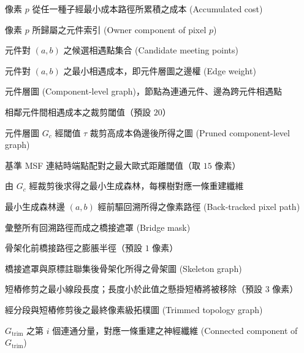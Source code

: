 \begin{denotation}[3cm]
\item[$D(p)$]{
  像素 $p$ 從任一種子經最小成本路徑所累積之成本 (Accumulated cost)
}

\item[$O(p)$]{
  像素 $p$ 所歸屬之元件索引 (Owner component of pixel $p$)
}

\item[$\mathcal{M}_{ab}$]{
  元件對 $(a, b)$ 之候選相遇點集合 (Candidate meeting points)
}

\item[$w_{ab}$]{
  元件對 $(a, b)$ 之最小相遇成本，即元件層圖之邊權 (Edge weight)
}

\item[$G_{c}$]{
  元件層圖 (Component-level graph)，節點為連通元件、邊為跨元件相遇點
}

\item[$\tau$]{
  相鄰元件間相遇成本之裁剪閾值（預設 $20$）
}

\item[$G_{c}^{\text{pruned}}$]{
  元件層圖 $G_{c}$ 經閾值 $\tau$ 裁剪高成本偽邊後所得之圖 (Pruned component-level graph)
}

\item[$d_{\max}$]{
  基準 MSF 連結時端點配對之最大歐式距離閾值（取 $15$ 像素）
}

\item[$G_{\text{msf}}$]{
  由 $G_{c}$ 經裁剪後求得之最小生成森林，每棵樹對應一條重建纖維
}

\item[$\Pi_{(a,b)}$]{
  最小生成森林邊 $(a, b)$ 經前驅回溯所得之像素路徑 (Back-tracked pixel path)
}

\item[$\mathcal{B}$]{
  彙整所有回溯路徑而成之橋接遮罩 (Bridge mask)
}

\item[$r_{d}$]{
  骨架化前橋接路徑之膨脹半徑（預設 $1$ 像素）
}

\item[$G_{\text{skel}}$]{
  橋接遮罩與原標註聯集後骨架化所得之骨架圖 (Skeleton graph)
}

\item[$\ell_{\min}$]{
  短樁修剪之最小線段長度；長度小於此值之懸掛短樁將被移除（預設 $3$ 像素）
}

\item[$G_{\text{trim}}$]{
  經分段與短樁修剪後之最終像素級拓樸圖 (Trimmed topology graph)
}

\item[$T_i$]{
  $G_{\text{trim}}$ 之第 $i$ 個連通分量，對應一條重建之神經纖維 (Connected component of $G_{\text{trim}}$)
}


\end{denotation}
